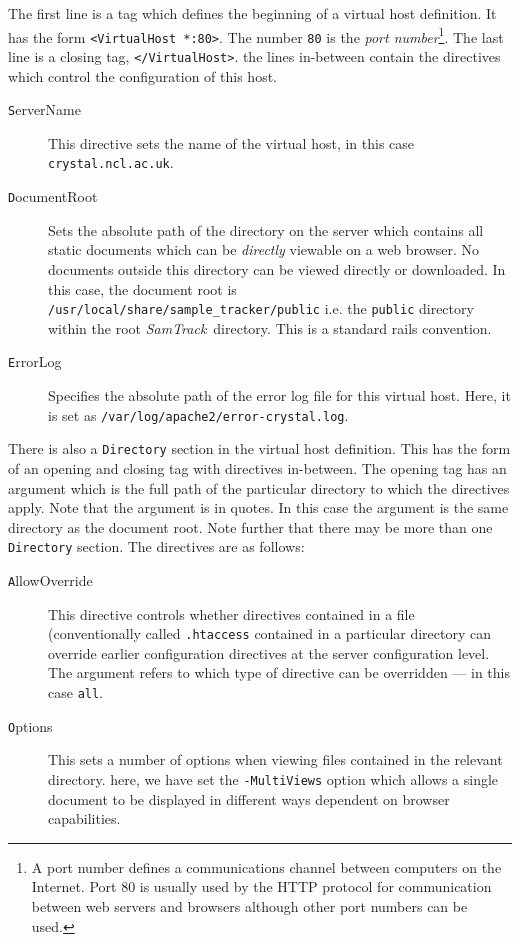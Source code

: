 \documentclass[12pt,twoside]{article}
\newcommand{\samtrack}{\emph{SamTrack}}
\begin{document}
The first line is a tag which defines the beginning of a virtual host
definition. It has the form \verb=<VirtualHost *:80>=. The number \verb=80=
is the \emph{port number}\footnote{A port number defines a communications
channel between computers on the Internet. Port 80 is usually
used by the HTTP protocol for communication between web servers and browsers
although other port numbers can be used.}.
The last line is a closing tag, \verb=</VirtualHost>=. the lines in-between
contain the directives which control the configuration of this host.
\begin{description}
\item[\texttt ServerName]
This directive sets the name of the virtual host, in this case
\verb=crystal.ncl.ac.uk=.
\item[\texttt DocumentRoot]
Sets the absolute path of the directory on the server which contains
all static documents which can be \emph{directly} viewable on a web browser.
No documents outside this directory can be viewed directly or downloaded.
In this case, the document root is 
\verb=/usr/local/share/sample_tracker/public=
i.e. the \verb=public= directory within the root \samtrack\ directory.
This is a standard rails convention.
\item[\texttt ErrorLog]
Specifies the absolute path of the error log file for this virtual host.
Here, it is set as \verb=/var/log/apache2/error-crystal.log=.
\end{description}
There is also a \verb=Directory= section in the virtual host definition.
This has the form of an opening and closing tag with directives in-between.
The opening tag has an argument which is the full path of the particular
directory to which the directives apply. Note that the argument is in quotes.
In this case the argument is the same directory as the document root.
Note further that there may be more than one \verb=Directory= section.
The directives are as follows:
\begin{description}
\item[\texttt AllowOverride]
This directive controls whether directives contained in a file
(conventionally called \verb=.htaccess= contained in a particular
directory can override earlier configuration directives at the server
configuration level. The argument refers to which type of directive
can be overridden --- in this case \verb=all=.
\item[\texttt Options]
This sets a number of options when viewing files contained in the
relevant directory. here, we have set the \verb=-MultiViews= option
which allows a single document to be displayed in different ways dependent
on browser capabilities.
\end{description}
\end{document}
